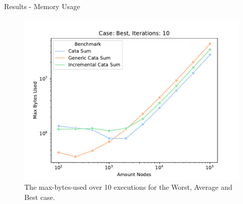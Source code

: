 \begin{slide}{Results - Memory Usage}
\begin{figure}[H]
\begin{minipage}{.32\textwidth}
    \includegraphics[width=\textwidth]{images/memory/Best/10/all_benchmarks.pdf}  
  \end{minipage}
  \caption{The max-bytes-used over 10 executions for the Worst, Average and Best case.}
  \label{fig-mem-usage-no-policy}
\end{figure}
\end{slide}
